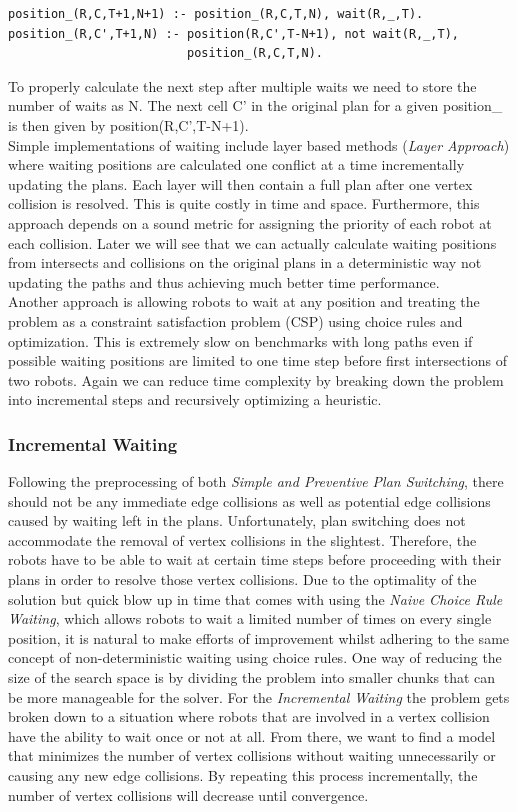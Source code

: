 \documentclass{llncs}
\begin{document}
\begin{verbatim}
position_(R,C,T+1,N+1) :- position_(R,C,T,N), wait(R,_,T).
position_(R,C',T+1,N) :- position(R,C',T-N+1), not wait(R,_,T),     
                         position_(R,C,T,N).
\end{verbatim}
To properly calculate the next step after multiple waits we need to store the number of waits as N. The next cell C' in the original plan for a given position\_ is then given by position(R,C',T-N+1).\\
Simple implementations of waiting include layer based methods (\emph{Layer Approach}) where waiting positions are calculated one conflict at a time incrementally updating the plans. Each layer will then contain a full plan after one vertex collision is resolved. This is quite costly in time and space. Furthermore, this approach depends on a sound metric for assigning the priority of each robot at each collision.
Later we will see that we can actually calculate waiting positions from intersects and collisions on the original plans in a deterministic way not updating the paths and thus achieving much better time performance.\\
Another approach is allowing robots to wait at any position and treating the problem as a constraint satisfaction problem (CSP) using choice rules and optimization. This is extremely slow on benchmarks with long paths even if possible waiting positions are limited to one time step before first intersections of two robots. Again we can reduce time complexity by breaking down the problem into incremental steps and recursively optimizing a heuristic.

\subsubsection{Incremental Waiting}
Following the preprocessing of both \emph{Simple and Preventive Plan Switching}, there should not be any immediate edge collisions as well as potential edge collisions caused by waiting left in the plans. Unfortunately, plan switching does not accommodate the removal of vertex collisions in the slightest. Therefore, the robots have to be able to wait at certain time steps before proceeding with their plans in order to resolve those vertex collisions. Due to the optimality of the solution but quick blow up in time that comes with using the \emph{Naive Choice Rule Waiting}, which allows robots to wait a limited number of times on every single position, it is natural to make efforts of improvement whilst adhering to the same concept of non-deterministic waiting using choice rules.
One way of reducing the size of the search space is by dividing the problem into smaller chunks that can be more manageable for the solver. For the \emph{Incremental Waiting} the problem gets broken down to a situation where robots that are involved in a vertex collision have the ability to wait once or not at all.
From there, we want to find a model that minimizes the number of vertex collisions without waiting unnecessarily or causing any new edge collisions.
By repeating this process incrementally, the number of vertex collisions will decrease until convergence.
\end{document}
